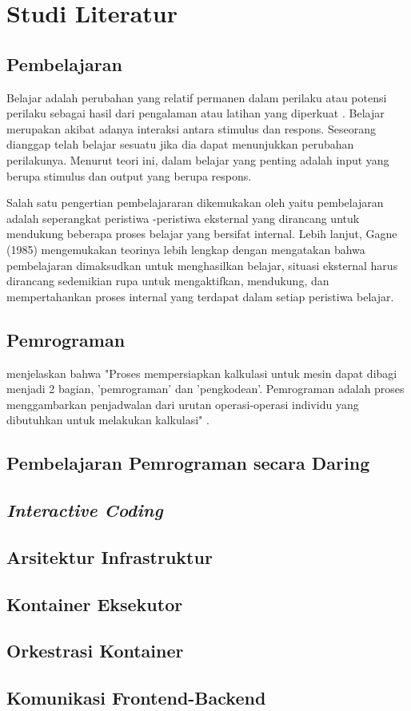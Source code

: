 \chapter{Studi Literatur}

\section{Pembelajaran}
Belajar adalah perubahan yang relatif permanen dalam perilaku atau potensi perilaku sebagai hasil dari pengalaman atau latihan yang diperkuat \parencite{slavin2017}. Belajar merupakan akibat adanya interaksi antara stimulus dan respons. Seseorang dianggap telah belajar sesuatu jika dia dapat menunjukkan perubahan perilakunya. Menurut teori ini, dalam belajar yang penting adalah input yang berupa stimulus dan output yang berupa respons.

Salah satu pengertian pembelajararan dikemukakan oleh \textcite{gagne1970} yaitu pembelajaran adalah seperangkat peristiwa -peristiwa eksternal yang dirancang untuk mendukung beberapa proses belajar yang bersifat internal. Lebih lanjut, Gagne (1985) mengemukakan teorinya lebih lengkap dengan mengatakan bahwa pembelajaran dimaksudkan untuk menghasilkan belajar, situasi eksternal harus dirancang sedemikian rupa untuk mengaktifkan, mendukung, dan mempertahankan proses internal yang terdapat dalam setiap peristiwa belajar.

\section{Pemrograman}
\textcite{hartree2012calculating} menjelaskan bahwa "Proses mempersiapkan kalkulasi untuk mesin dapat dibagi menjadi 2 bagian, 'pemrograman' dan 'pengkodean'. Pemrograman adalah proses menggambarkan penjadwalan dari urutan operasi-operasi individu yang dibutuhkan untuk melakukan kalkulasi" \parencite[p.~111]{hartree2012calculating}.

\section{Pembelajaran Pemrograman secara Daring}
\blindtext

\section{\textit{Interactive Coding}}
\blindtext

\section{Arsitektur Infrastruktur}
\blindtext

\section{Kontainer Eksekutor}
\blindtext

\section{Orkestrasi Kontainer}
\blindtext

\section{Komunikasi Frontend-Backend}
\blindtext

